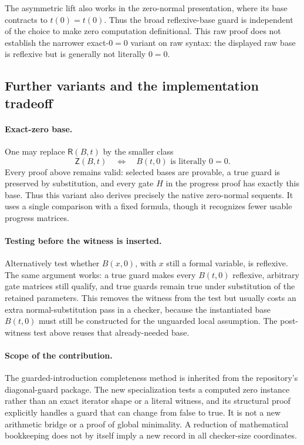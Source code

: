 \documentclass[11pt,a4paper]{article}
\theoremstyle{definition}
\begin{document}
The asymmetric lift also works in the zero-normal presentation, where
its base contracts to $t(0)=t(0)$.  Thus the broad reflexive-base guard
is independent of the choice to make zero computation definitional.
This raw proof does not establish the narrower exact-$0=0$ variant on
raw syntax: the displayed raw base is reflexive but is generally not
literally $0=0$.

\subsection{Further variants and the implementation tradeoff}

\paragraph{Exact-zero base.}
One may replace $\mathsf R(B,t)$ by the smaller class
\[
 \mathsf Z(B,t)\quad\Longleftrightarrow\quad
 B(t,0)\text{ is literally }0=0.
\]
Every proof above remains valid: selected bases are provable, a true
guard is preserved by substitution, and every gate $H$ in the progress
proof has exactly this base.  Thus this variant also derives precisely
the native zero-normal sequents.  It uses a single comparison with a
fixed formula, though it recognizes fewer usable progress matrices.

\paragraph{Testing before the witness is inserted.}
Alternatively test whether $B(x,0)$, with $x$ still a formal variable,
is reflexive.  The same argument works: a true guard makes every
$B(t,0)$ reflexive, arbitrary gate matrices still qualify, and true
guards remain true under substitution of the retained parameters.
This removes the witness from the test but usually costs an extra
normal-substitution pass in a checker, because the instantiated base
$B(t,0)$ must still be constructed for the unguarded local assumption.
The post-witness test above reuses that already-needed base.

\paragraph{Scope of the contribution.}
The guarded-introduction completeness method is inherited from the
repository's diagonal-guard package.  The new specialization tests a
computed zero instance rather than an exact iterator shape or a literal
witness, and its structural proof explicitly handles a guard that can
change from false to true.  It is not a new arithmetic bridge or a
proof of global minimality.  A reduction of mathematical bookkeeping
does not by itself imply a new record in all checker-size coordinates.
\end{document}
